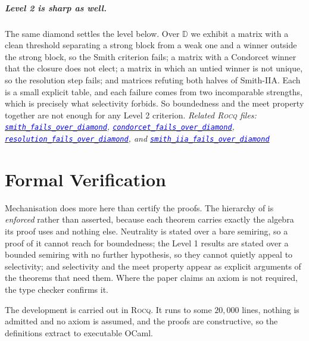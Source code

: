 \documentclass[a4paper,UKenglish,cleveref,autoref,thm-restate,anonymous]{lipics-v2021}
\newcommand{\rocq}{\textsc{Rocq}}
\newcommand{\Diam}{\mathbb{D}}
\newcommand{\anonrepo}{https://anonymous.4open.science/r/Semiring_graph_algorithm-000E}
\newcommand{\rocqfile}[2]{\href{\anonrepo/#1}{\textcolor{blue}{\texttt{#2}}}}
\newcommand{\rocqrelated}[1]{{\footnotesize\itshape Related \rocq{} files: #1}}
\begin{document}
\subparagraph*{Level 2 is sharp as well.}
The same diamond settles the level below. Over $\Diam$ we exhibit a matrix
with a clean threshold separating a strong block from a weak one and a
winner outside the strong block, so the Smith criterion fails; a matrix
with a Condorcet winner that the closure does not elect; a matrix in which
an untied winner is not unique, so the resolution step fails; and
matrices refuting both halves of Smith-IIA. Each is a small explicit
table, and each failure comes from two incomparable strengths, which is
precisely what selectivity forbids. So boundedness and the meet property
together are not enough for any Level 2 criterion.
\rocqrelated{\rocqfile{examples/SharpnessWitness.v}{smith\_fails\_over\_diamond},
\rocqfile{examples/SharpnessWitness.v}{condorcet\_fails\_\allowbreak over\_diamond},
\rocqfile{examples/SharpnessWitness.v}{resolution\_fails\_\allowbreak over\_diamond}, and
\rocqfile{examples/SharpnessWitness.v}{smith\_iia\_fails\_\allowbreak over\_diamond}}

\section{Formal Verification}\label{sec:formalisation}

Mechanisation does more here than certify the proofs. The hierarchy of
 is \emph{enforced} rather than asserted, because
each theorem carries exactly the algebra its proof uses and nothing else.
Neutrality is stated over a bare semiring, so a proof of it cannot reach
for boundedness; the Level 1 results are stated over a bounded semiring
with no further hypothesis, so they cannot quietly appeal to selectivity;
and selectivity and the meet property appear as explicit arguments of the
theorems that need them. Where the paper claims an axiom is not required,
the type checker confirms it.

The development is carried out in \rocq{}. It runs to some $20{,}000$
lines, nothing is admitted and no axiom is assumed, and the proofs are
constructive, so the definitions extract to executable OCaml.
\end{document}
